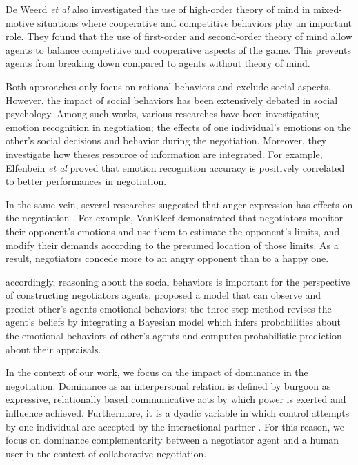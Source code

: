 \documentclass[conference, letterpaper]{IEEEtran}
\begin{document}
	De Weerd \textit{et al} \cite{de2013higher} also investigated the use of high-order theory of mind in mixed-motive situations where cooperative and competitive behaviors play an important role. They found that the use of first-order and second-order theory of mind allow agents to balance competitive and cooperative	aspects of the game. This prevents agents from breaking down compared to  agents without theory of mind.
	
	
	Both approaches only focus on rational behaviors and exclude social aspects. However, the impact of social behaviors has been extensively debated in social psychology. Among such works, various researches have been investigating emotion recognition in negotiation; the effects of one individual's	emotions on the other's social decisions and behavior during the negotiation. Moreover, they investigate how theses resource of information are integrated.
	For example, Elfenbein\textit{ et al} \cite{elfenbein2007reading} proved that  emotion recognition accuracy is positively correlated to  better performances in negotiation.
	
	In the same vein, several researches suggested that anger expression has effects on the negotiation \cite{sinaceur2006get,van2010interpersonal,ferguson2004social}. For example, VanKleef \cite{van2004interpersonal} demonstrated that negotiators monitor their opponent's emotions and use them to estimate the opponent's limits, and modify their demands according to the presumed location of those limits. As a result, negotiators concede more to an angry opponent than to a happy one. 
	
	
	accordingly, reasoning about the social behaviors is important for the perspective of constructing negotiators agents. \cite{alfonso2015emotional} proposed a model that can observe and predict other's agents emotional behaviors: the three step method revises the agent's  beliefs by integrating a Bayesian model which infers probabilities about the emotional behaviors of other's agents and computes probabilistic prediction about their appraisals.
	
	
	In the context of our work, we focus on the impact of dominance in the negotiation. Dominance as an interpersonal relation is defined by burgoon \cite{burgoon1998nature} as expressive, relationally based communicative acts by which power is exerted and influence achieved. Furthermore, it is a dyadic variable in which control attempts by one individual are accepted by the
	interactional partner \cite{dunbar2005perceptions}. For this reason, we focus on dominance complementarity between a negotiator agent and a human user in the context of collaborative negotiation. 
	
\end{document}
